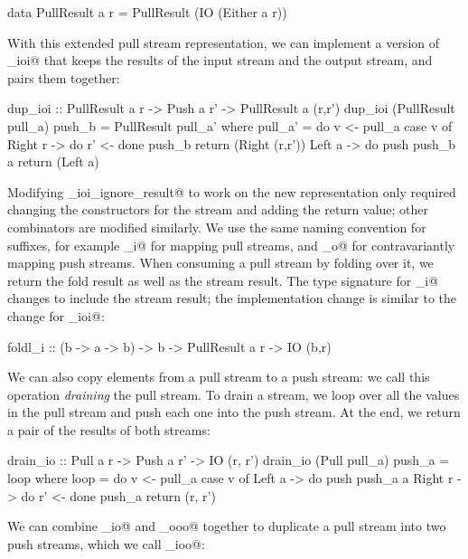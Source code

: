 \begin{haskell}
data PullResult a r = PullResult (IO (Either a r))
\end{haskell}

With this extended pull stream representation, we can implement a version of \Hs@dup_ioi@ that keeps the results of the input stream and the output stream, and pairs them together:

\begin{haskell}
dup_ioi :: PullResult a r -> Push a r' -> PullResult a (r,r')
dup_ioi (PullResult pull_a) push_b = PullResult pull_a'
 where
  pull_a' = do
    v <- pull_a
    case v of
     Right r -> do
      r' <- done push_b
      return (Right (r,r'))
     Left a -> do
      push push_b a
      return (Left a)
\end{haskell}

Modifying \Hs@dup_ioi_ignore_result@ to work on the new representation only required changing the constructors for the stream and adding the return value; other combinators are modified similarly.
We use the same naming convention for suffixes, for example \Hs@map_i@ for mapping pull streams, and \Hs@map_o@ for contravariantly mapping push streams.
When consuming a pull stream by folding over it, we return the fold result as well as the stream result.
The type signature for \Hs@foldl_i@ changes to include the stream result; the implementation change is similar to the change for \Hs@dup_ioi@:

\begin{haskell}
foldl_i :: (b -> a -> b) -> b -> PullResult a r -> IO (b,r)
\end{haskell}

We can also copy elements from a pull stream to a push stream: we call this operation \emph{draining} the pull stream.
To drain a stream, we loop over all the values in the pull stream and push each one into the push stream.
At the end, we return a pair of the results of both streams:

\begin{haskell}
drain_io :: Pull a r -> Push a r' -> IO (r, r')
drain_io (Pull pull_a) push_a = loop
 where
  loop = do
    v <- pull_a
    case v of
     Left a -> do
      push push_a a
     Right r -> do
      r' <- done push_a
      return (r, r')
\end{haskell}

We can combine \Hs@drain_io@ and \Hs@dup_ooo@ together to duplicate a pull stream into two push streams, which we call \Hs@dup_ioo@:

